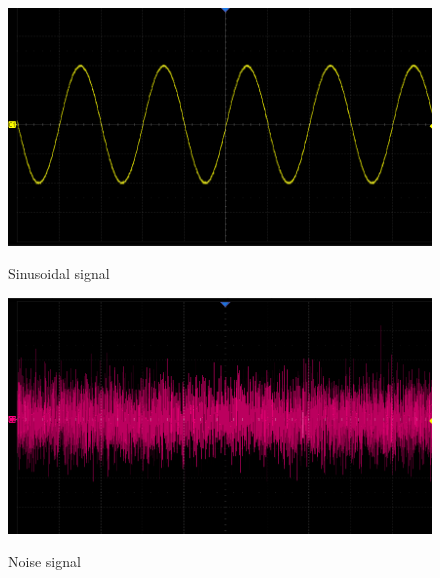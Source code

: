 \documentclass[a4paper,12pt]{article}
\begin{document}
\begin{figure}[H]
    \centering
    \begin{minipage}[b]{0.45\linewidth} %
        \centering
        \label{fig:sin}
        \includegraphics[width=\linewidth]{sin.png}
        \caption{Sinusoidal signal}
    \end{minipage}
    \hspace{0.05\linewidth} %
    \begin{minipage}[b]{0.45\linewidth} %
        \centering
        \label{fig:noise}
        \includegraphics[width=\linewidth]{noise.png}
        \caption{Noise signal}
    \end{minipage}
    

\end{figure}
\end{document}
